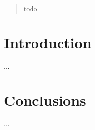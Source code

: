 \documentclass[a0,landscape]{a0poster}
\begin{document}
\begin{multicols}{4} %


\color{Navy} %

\begin{abstract}

todo

\end{abstract}



\section*{Introduction}

...


\section*{Conclusions}

...

\color{DarkSlateGray} %




\end{multicols}
\end{document}
